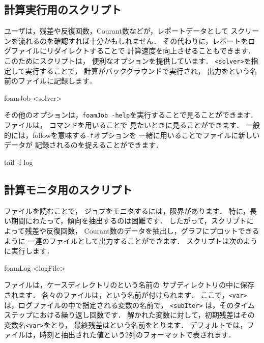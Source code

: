 \subsection{計算実行用のスクリプト}
\label{ssec:6.6.1}
%
%
ユーザは，残差や反復回数，Courant数などが，レポートデータとして
スクリーンを流れるのを確認すれば十分かもしれません．
その代わりに，レポートをログファイルにリダイレクトすることで
計算速度を向上させることもできます．
このためにスクリプトは，
便利なオプションを提供しています．
\verb|<solver>|を指定して実行することで，
計算がバックグラウンドで実行され，
出力をという名前のファイルに記録します．
\begin{OFverbatim}[terminal]
foamJob <solver>
\end{OFverbatim}
その他のオプションは，\verb|foamJob -help|を実行することで見ることができます．
ファイルは， コマンドを用いることで
見たいときに見ることができます．
一般的には，followを意味する\verb|-f|オプションを
一緒に用いることでファイルに新しいデータが
記録されるのを捉えることができます．
\begin{OFverbatim}[terminal]
tail -f log
\end{OFverbatim}


\subsection{計算モニタ用のスクリプト}
\label{ssec:6.6.2}
%
%
ファイルを読むことで，
ジョブをモニタするには，限界があります．
特に，長い期間にわたって，傾向を抽出するのは困難です．
したがって，スクリプトによって残差や反復回数，
Courant数のデータを抽出し，グラフにプロットできるように
一連のファイルとして出力することができます．
スクリプトは次のように実行します．
\begin{OFverbatim}[terminal]
foamLog <logFile>
\end{OFverbatim}
ファイルは，ケースディレクトリのという名前の
サブディレクトリの中に保存されます．
各々のファイルは，という名前が付けられます．
ここで，\texttt{<var>} は，ログファイルの中で指定される変数の名前で，
\texttt{<subIter>} は，そのタイムステップにおける繰り返し回数です．
解かれた変数に対して，初期残差はその変数名\texttt{<var>}をとり，
最終残差はという名前をとります．
デフォルトでは，ファイルは，時刻と抽出された値という2列のフォーマットで表されます．


